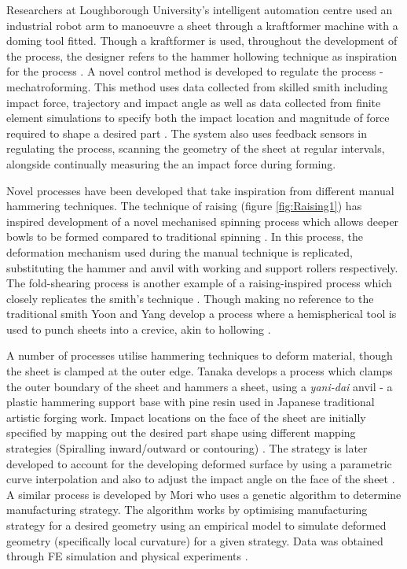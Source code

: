 Researchers at Loughborough University's intelligent automation centre used an industrial robot arm to manoeuvre a sheet through a kraftformer machine with a doming tool fitted. Though a kraftformer is used, throughout the development of the process, the designer refers to the hammer hollowing technique as inspiration for the process \citep{Ilangovan2016FixturelessForming}. A novel control method is developed to regulate the process - mechatroforming. This method uses data collected from skilled smith including impact force, trajectory and impact angle as well as data collected from finite element simulations to specify both the impact location and magnitude of force required to shape a desired part \citep{Ilangovan2016AnForming}. The system also uses feedback sensors in regulating the process, scanning the geometry of the sheet at regular intervals, alongside continually measuring the an impact force during forming.

Novel processes have been developed that take inspiration from different manual hammering techniques. The technique of raising (figure \ref{fig:Raising1}) has inspired development of a novel mechanised spinning process which allows deeper bowls to be formed compared to traditional spinning \citep{Russo2020RaisingSpinning}. In this process, the deformation mechanism used during the manual technique is replicated, substituting the hammer and anvil with working and support rollers respectively. The fold-shearing process is another example of a raising-inspired process which closely replicates the smith's technique \citep{Allwood2019Folding-shearing:Change}. Though making no reference to the traditional smith Yoon and Yang develop a process where a hemispherical tool is used to punch sheets into a crevice, akin to hollowing \citep{Yoon2001InvestigationMetal}. 

A number of processes utilise hammering techniques to deform material, though the sheet is clamped at the outer edge. Tanaka develops a process which clamps the outer boundary of the sheet and hammers a sheet, using a \textit{yani-dai} anvil - a plastic hammering support base with pine resin used in Japanese traditional artistic forging work. Impact locations on the face of the sheet are initially specified by mapping out the desired part shape using different mapping strategies (Spiralling inward/outward or contouring) \citep{Tanaka2005DevelopmentWorking}. The strategy is later developed to account for the developing deformed surface by using a parametric curve interpolation \citep{Asakawa2010DevelopmentProcess} and also to adjust the impact angle on the face of the sheet \citep{Takasugi2012DevelopmentShape}. A similar process is developed by Mori who uses a genetic algorithm to determine manufacturing strategy. The algorithm works by optimising manufacturing strategy for a desired geometry using an empirical model to simulate deformed geometry (specifically local curvature) for a given strategy. Data was obtained through FE simulation and physical experiments \citep{Mori1996DeterminationAlgorithm}. 

